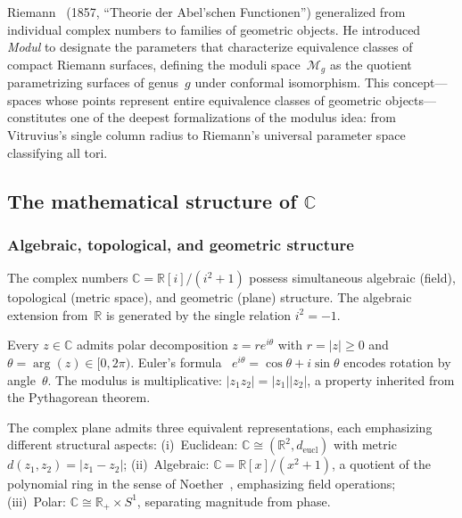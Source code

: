 Riemann~\cite{riemann1857} (1857, ``Theorie der Abel'schen Functionen'') generalized from
individual complex numbers to families of geometric objects.  He
introduced \emph{Modul} to designate the parameters that characterize
equivalence classes of compact Riemann surfaces, defining the moduli
space~$\mathcal{M}_g$ as the quotient parametrizing surfaces of
genus~$g$ under conformal isomorphism.  This concept---spaces whose
points represent entire equivalence classes of geometric
objects---constitutes one of the deepest formalizations of the modulus
idea: from Vitruvius's single column radius to Riemann's universal
parameter space classifying all tori.



\subsection{The mathematical structure of
$\mathbb{C}$}\label{ssec:C-structure}

\subsubsection{Algebraic, topological, and geometric structure}

The complex numbers $\mathbb{C} = \mathbb{R}[i]/(i^2+1)$ possess
simultaneous algebraic (field), topological (metric space), and
geometric (plane) structure.  The algebraic extension from~$\mathbb{R}$
is generated by the single relation $i^2 = -1$.

Every $z \in \mathbb{C}$ admits polar decomposition
$z = r e^{i\theta}$ with $r = |z| \geq 0$ and
$\theta = \arg(z) \in [0, 2\pi)$.  Euler's formula~\cite{euler55}
$e^{i\theta} = \cos\theta + i\sin\theta$ encodes rotation by
angle~$\theta$.  The modulus is multiplicative:
$|z_1 z_2| = |z_1||z_2|$, a property inherited from the Pythagorean
theorem.

The complex plane admits three equivalent representations, each
emphasizing different structural aspects:
(i)~Euclidean: $\mathbb{C} \cong (\mathbb{R}^2, d_{\mathrm{eucl}})$
with metric $d(z_1, z_2) = |z_1 - z_2|$;
(ii)~Algebraic: $\mathbb{C} = \mathbb{R}[x]/(x^2+1)$, a quotient of the polynomial ring in the sense of Noether~\cite{noether21}, emphasizing field operations;
(iii)~Polar: $\mathbb{C} \cong \mathbb{R}_+ \times S^1$, separating
magnitude from phase.

